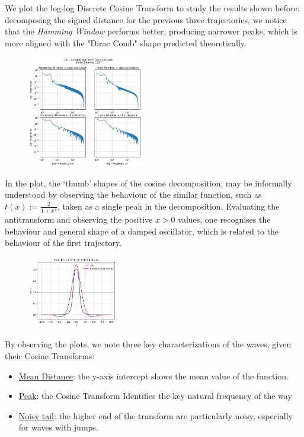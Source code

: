 \documentclass[10pt, twocolumn]{article}
\begin{document}
        We plot the log-log Discrete Cosine Transform to study the results shown before: decomposing the signed distance for the previous three trajectories, we notice that the \textit{Hamming Window} performs better, producing narrower peaks, which is more aligned with the "Dirac Comb" shape predicted theoretically.
        \begin{figure}[H]
          \centering
          \includegraphics[width=0.45\textwidth]{figures/dct_120_loglog.png}
          \label{fig:dct1}
        \end{figure}

        In the plot, the `thumb' shapes of the cosine decomposition, may be informally understood by observing the behaviour of the similar function, such as $t(x) := \frac{2}{1+x^4}$, taken as a single peak in the decomposition. Evaluating the antitransform and observing the positive $x>0$ values, one recognises the behaviour and general shape of a damped oscillator, which is related to the behaviour of the first trajectory.

        \begin{figure}[H]
          \centering
          \includegraphics[width=0.35\textwidth]{figures/f_and_cos_antitr.png}
          \label{fig:antitransform}
        \end{figure}

        By observing the plots, we note three key characterizations of the waves, given their Cosine Transforms:
        \begin{itemize}
          \item \underline{Mean Distance}: the y-axis intercept shows the mean value of the function.
          \item \underline{Peak}: the Cosine Transform Identifies the key natural frequency of the way
          \item \underline{Noisy tail}: the higher end of the transform are particularly noisy, especially for waves with jumps.
        \end{itemize}
\end{document}
